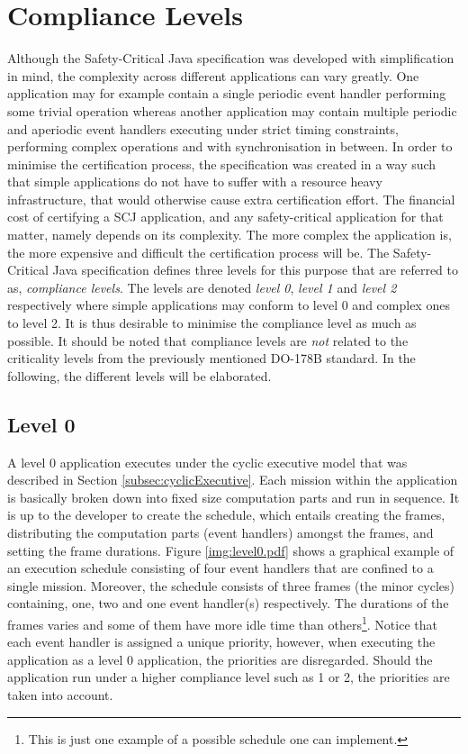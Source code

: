 \section{Compliance Levels}
\label{section:complianceLevels}
Although the Safety-Critical Java specification was developed with simplification in mind, the complexity across different applications can vary greatly. One application may for example contain a single periodic event handler performing some trivial operation whereas another application may contain multiple periodic and aperiodic event handlers executing under strict timing constraints, performing complex operations and with synchronisation in between. In order to minimise the certification process, the specification was created in a way such that simple applications do not have to suffer with a resource heavy infrastructure, that would otherwise cause extra certification effort. The financial cost of certifying a SCJ application, and any safety-critical application for that matter, namely depends on its complexity. The more complex the application is, the more expensive and difficult the certification process will be. The Safety-Critical Java specification defines three levels for this purpose that are referred to as, \textit{compliance levels}. The levels are denoted \textit{level 0}, \textit{level 1} and \textit{level 2} respectively where simple applications may conform to level 0 and complex ones to level 2. It is thus desirable to minimise the compliance level as much as possible. It should be noted that compliance levels are \textit{not} related to the criticality levels from the previously mentioned DO-178B standard. In the following, the different levels will be elaborated.

\subsection{Level 0}
A level 0 application executes under the cyclic executive model that was described in Section \ref{subsec:cyclicExecutive}. Each mission within the application is basically broken down into fixed size computation parts and run in sequence. It is up to the developer to create the schedule, which entails creating the frames, distributing the computation parts (event handlers) amongst the frames, and setting the frame durations. Figure \ref{img:level0.pdf} shows a graphical example of an execution schedule consisting of four event handlers that are confined to a single mission. Moreover, the schedule consists of three frames (the minor cycles) containing, one, two and one event handler(s) respectively. The durations of the frames varies and some of them have more idle time than others\footnote{This is just one example of a possible schedule one can implement.}. Notice that each event handler is assigned a unique priority, however, when executing the application as a level 0 application, the priorities are disregarded. Should the application run under a higher compliance level such as 1 or 2, the priorities are taken into account. 

